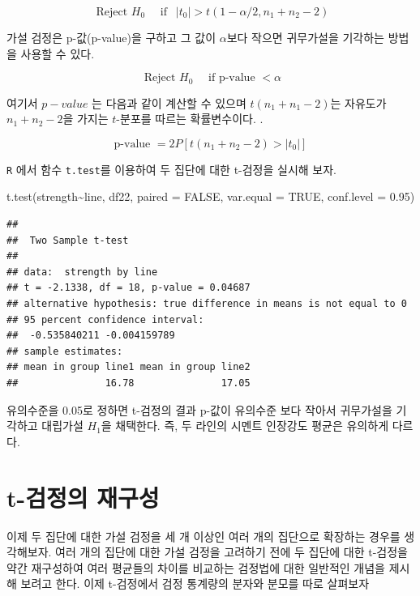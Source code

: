 \documentclass[
]{book}
\newenvironment{Shaded}{\begin{snugshade}}{\end{snugshade}}
\newcommand{\AttributeTok}[1]{\textcolor[rgb]{0.77,0.63,0.00}{#1}}
\newcommand{\ConstantTok}[1]{\textcolor[rgb]{0.00,0.00,0.00}{#1}}
\newcommand{\FloatTok}[1]{\textcolor[rgb]{0.00,0.00,0.81}{#1}}
\newcommand{\FunctionTok}[1]{\textcolor[rgb]{0.00,0.00,0.00}{#1}}
\newcommand{\NormalTok}[1]{#1}
\newcommand{\SpecialCharTok}[1]{\textcolor[rgb]{0.00,0.00,0.00}{#1}}
\begin{document}
\[ \text{ Reject } H_0  \quad \text { if } ~~ |t_0| > t(1-\alpha/2, n_1 + n_2 -2 ) \]

가설 검정은 p-값(p-value)을 구하고 그 값이 \(\alpha\)보다 작으면 귀무가설을 기각하는 방법을 사용할 수 있다.

\[ \text{ Reject } H_0  \quad \text { if    p-value } < \alpha \]

여기서 \(p-value\) 는 다음과 같이 계산할 수 있으며 \(t(n_1 + n_1 -2 )\)는 자유도가 \(n_1 + n_2 -2\)을 가지는 \(t\)-분포를 따르는 확률변수이다. .

\[ \text {p-value }=2 P[ t(n_1 + n_2 -2 ) >|t_0|] \]

\texttt{R} 에서 함수 \texttt{t.test}를 이용하여 두 집단에 대한 t-검정을 실시해 보자.

\begin{Shaded}
\begin{Highlighting}[]
\FunctionTok{t.test}\NormalTok{(strength}\SpecialCharTok{\textasciitilde{}}\NormalTok{line, df22, }\AttributeTok{paired =} \ConstantTok{FALSE}\NormalTok{, }\AttributeTok{var.equal =} \ConstantTok{TRUE}\NormalTok{, }\AttributeTok{conf.level =} \FloatTok{0.95}\NormalTok{)}
\end{Highlighting}
\end{Shaded}

\begin{verbatim}
## 
##  Two Sample t-test
## 
## data:  strength by line
## t = -2.1338, df = 18, p-value = 0.04687
## alternative hypothesis: true difference in means is not equal to 0
## 95 percent confidence interval:
##  -0.535840211 -0.004159789
## sample estimates:
## mean in group line1 mean in group line2 
##               16.78               17.05
\end{verbatim}

유의수준을 0.05로 정하면 t-검정의 결과 p-값이 유의수준 보다 작아서 귀무가설을 기각하고 대립가설 \(H_1\)을 채택한다. 즉, 두 라인의 시멘트 인장강도 평균은 유의하게 다르다.

\hypertarget{t-uxac80uxc815uxc758-uxc7acuxad6cuxc131}{%
\section{t-검정의 재구성}\label{t-uxac80uxc815uxc758-uxc7acuxad6cuxc131}}

이제 두 집단에 대한 가설 검정을 세 개 이상인 여러 개의 집단으로 확장하는 경우를 생각해보자.
여러 개의 집단에 대한
가설 검정을 고려하기 전에 두 집단에 대한 t-검정을 약간 재구성하여 여러 평균들의 차이를 비교하는 검정법에 대한 일반적인 개념을 제시해 보려고 한다. 이제 t-검정에서 검정 통계량의 분자와 분모를 따로 살펴보자
\end{document}
